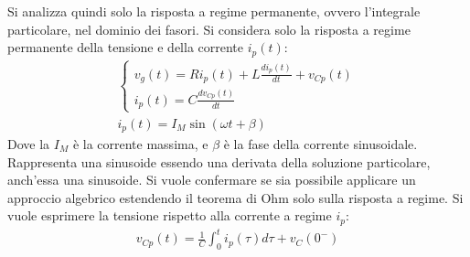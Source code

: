 \documentclass{article}
\numberwithin{equation}{subsection}
\begin{document}
%        
%
Si analizza quindi solo la risposta a regime permanente, ovvero l'integrale particolare, nel dominio dei fasori. Si considera solo la risposta a regime permanente della 
tensione e della corrente $i_p(t)$:
\begin{gather*}
    \begin{cases}
        v_g(t)=Ri_p(t)+\displaystyle L\frac{di_p(t)}{dt}+v_{Cp}(t)\\
        i_p(t)=\displaystyle C\frac{dv_{Cp}(t)}{dt}
    \end{cases}\\
    i_p(t)=I_M\sin(\omega t+\beta)
\end{gather*}
Dove la $I_M$ è la corrente massima, e $\beta$ è la fase della corrente sinusoidale. Rappresenta una sinusoide essendo una derivata della soluzione particolare, anch'essa 
una sinusoide. Si vuole confermare se sia possibile applicare un approccio algebrico estendendo il 
teorema di Ohm solo sulla risposta a regime. Si vuole esprimere la tensione rispetto alla corrente a regime $i_p$:
\begin{gather*}
    v_{Cp}(t)=\displaystyle\frac{1}{C}\int_{0}^{t}i_p(\tau)d\tau+v_C(0^-)
\end{gather*}
\end{document}
